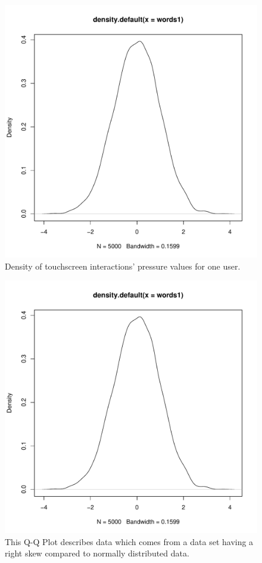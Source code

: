\documentclass{acm_proc_article-sp}
\begin{document}
\begin{figure}
\centering
\includegraphics[page=2, width=.45\textwidth, keepaspectratio]{Rplots.pdf}
\caption{
Density of touchscreen interactions' pressure values for one user.
}
\label{fig:normal_distribution}
\end{figure}

\begin{figure}
\centering
\includegraphics[page=4, width=.45\textwidth, keepaspectratio]{Rplots.pdf}
\caption{
This Q-Q Plot describes data which comes from
a data set having a right skew compared to normally distributed data.
}
\label{fig:qq_plot}
\end{figure}
\end{document}
